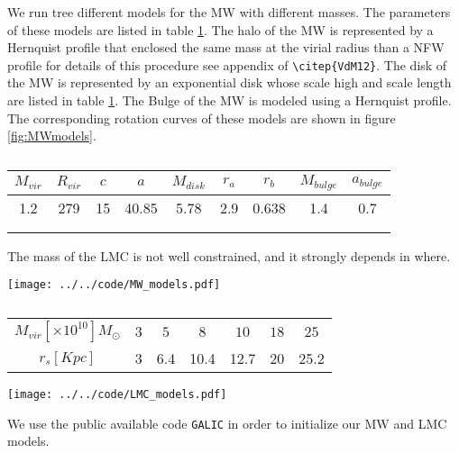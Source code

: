 \documentclass[a4paper,fleqn,usenatbib]{mnras}
\begin{document}
We run tree different models for the MW with different masses. The
parameters of these models are listed in table \ref{tab:MWmodels}. 
The halo of the MW is represented by a Hernquist profile that enclosed
the same mass at the virial radius than a NFW profile for details of
this procedure see appendix of \verb+\citep{VdM12}+. The disk of the
MW is represented by an exponential disk whose scale high and scale
length are listed in table \ref{tab:MWmodels}. The Bulge of the MW is
modeled using a Hernquist profile. The corresponding rotation curves
of these models are shown in figure \ref{fig:MWmodels}.

\begin{table}
\begin{tabular}{c c c c c c c c c}
\hline
\hline
$M_{vir}$ & $R_{vir}$ & $c$ & $a$ & $M_{disk}$ & $r_a$ & $r_b$ & $M_{bulge}$
& $a_{bulge}$\\
\hline
1.2 & 279 & 15 & 40.85 & 5.78  & 2.9 & 0.638 & 1.4 & 0.7\\
 & & & & & & & & \\
 & & & & & & & & \\
\hline
\end{tabular}
\caption{\label{tab:MWmodels}}
\end{table}

The mass of the LMC is not well constrained, and it strongly depends
in where.

\begin{figure*}
 \centering
 \texttt{[image: ../../code/MW\_models.pdf]}
 \caption{ MW models}
 \label{fig:MWmodels}
\end{figure*}


\begin{table}
\begin{tabular}{c c c c c c c}
\hline
\hline
$M_{vir} [\times 10^{10}] M_{\odot}$ & $3$ & $5$ & $ 8$& $10$ & $18$ &
$25$ \\
$r_{s} [Kpc]$ & 3 & 6.4& 10.4& 12.7& 20 & 25.2\\
\hline
\hline
\end{tabular}
\caption{\label{tab:LMCmodels}}
\end{table}

\begin{figure*}
 \centering
 \texttt{[image: ../../code/LMC\_models.pdf]}
 \caption{ LMC models}
 \label{fig:LMCmodels}
\end{figure*}

We use the public available code \verb+GALIC+ \citep{Yurin14} in order
to initialize our MW and LMC models. 
\end{document}
